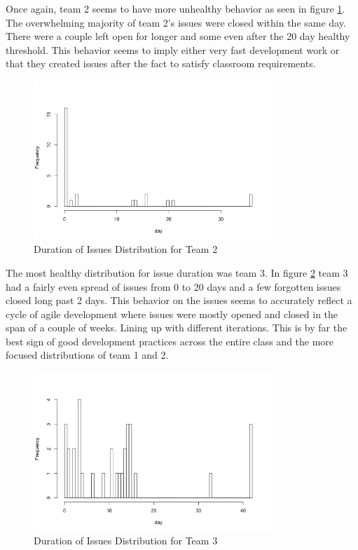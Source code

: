 \documentclass[conference]{IEEEtran}
\begin{document}
Once again, team 2 seems to have more unhealthy behavior as seen in figure \ref{issue_duration_team2}. The overwhelming majority of team 2's issues were closed within the same day. There were a couple left open for longer and some even after the 20 day healthy threshold. This behavior seems to imply either very fast development work or that they created issues after the fact to satisfy classroom requirements. 

\begin{figure}[H]
    \centering
    \includegraphics[width=9cm]{../AprilProject/pic/distribution/issue duration distribution team2.png}
    \caption{Duration of Issues Distribution for Team 2}
    \label{issue_duration_team2}
\end{figure}

The most healthy distribution for issue duration was team 3. In figure \ref{issue_duration_team3} team 3 had a fairly even spread of issues from 0 to 20 days and a few forgotten issues closed long past 2 days. This behavior on the issues seems to accurately reflect a cycle of agile development where issues were mostly opened and closed in the span of a couple of weeks. Lining up with different iterations. This is by far the best sign of good development practices across the entire class and the more focused distributions of team 1 and 2. 

\begin{figure}[H]
    \centering
    \includegraphics[width=9cm]{../AprilProject/pic/distribution/issue duration distribution team3.png}
    \caption{Duration of Issues Distribution for Team 3}
    \label{issue_duration_team3}
\end{figure}
\end{document}
